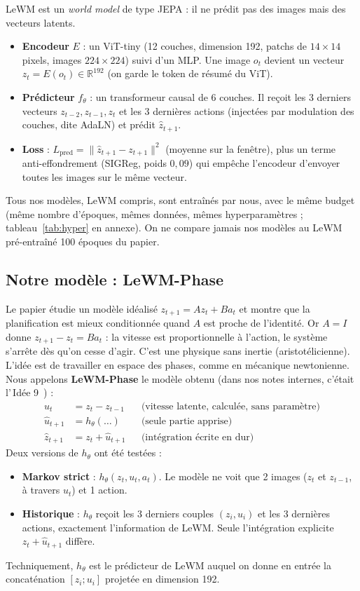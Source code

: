 \documentclass[11pt,a4paper]{article}
\newcommand{\og}{\guillemotleft\,\ignorespaces}
\newcommand{\fg}{\unskip\,\guillemotright}
\newcommand{\Lpred}{L_{\mathrm{pred}}}
\begin{document}
LeWM est un \emph{world model} de type JEPA : il ne prédit pas des images mais des vecteurs
latents.
\begin{itemize}
  \item \textbf{Encodeur} $E$ : un ViT-tiny (12 couches, dimension 192, patchs de
  $14\times14$ pixels, images $224\times224$) suivi d'un MLP. Une image $o_t$ devient un
  vecteur $z_t = E(o_t) \in \mathbb{R}^{192}$ (on garde le token de résumé du ViT).
  \item \textbf{Prédicteur} $f_\theta$ : un transformeur causal de 6 couches. Il reçoit les
  3 derniers vecteurs $z_{t-2}, z_{t-1}, z_t$ et les 3 dernières actions (injectées par
  modulation des couches, dite AdaLN) et prédit $\hat z_{t+1}$.
  \item \textbf{Loss} : $\Lpred = \|\hat z_{t+1} - z_{t+1}\|^2$ (moyenne sur la fenêtre),
  plus un terme anti-effondrement (SIGReg, poids $0{,}09$) qui empêche l'encodeur
  d'envoyer toutes les images sur le même vecteur.
\end{itemize}
Tous nos modèles, LeWM compris, sont entraînés par nous, avec le même budget (même nombre
d'époques, mêmes données, mêmes hyperparamètres ; tableau~\ref{tab:hyper} en annexe). On ne
compare jamais nos modèles au LeWM pré-entraîné 100 époques du papier.

\subsection{Notre modèle : LeWM-Phase}

Le papier étudie un modèle idéalisé $z_{t+1} = A z_t + B a_t$ et montre que la
planification est mieux conditionnée quand $A$ est proche de l'identité. Or $A = I$ donne
$z_{t+1} - z_t = B a_t$ : la vitesse est proportionnelle à l'action, le système s'arrête dès
qu'on cesse d'agir. C'est une physique sans inertie (aristotélicienne). L'idée est de
travailler en espace des phases, comme en mécanique newtonienne. Nous appelons
\textbf{LeWM-Phase} le modèle obtenu (dans nos notes internes, c'était l'\og Idée 9 \fg) :
\begin{align*}
  u_t &= z_t - z_{t-1} && \text{(vitesse latente, calculée, sans paramètre)}\\
  \hat u_{t+1} &= h_\theta(\ldots) && \text{(seule partie apprise)}\\
  \hat z_{t+1} &= z_t + \hat u_{t+1} && \text{(intégration écrite en dur)}
\end{align*}
Deux versions de $h_\theta$ ont été testées :
\begin{itemize}
  \item \textbf{Markov strict} : $h_\theta(z_t, u_t, a_t)$. Le modèle ne voit que 2 images
  ($z_t$ et $z_{t-1}$, à travers $u_t$) et 1 action.
  \item \textbf{Historique} : $h_\theta$ reçoit les 3 derniers couples $(z_i, u_i)$ et les
  3 dernières actions, exactement l'information de LeWM. Seule l'intégration explicite
  $z_t + \hat u_{t+1}$ diffère.
\end{itemize}
Techniquement, $h_\theta$ est le prédicteur de LeWM auquel on donne en entrée la
concaténation $[z_i ; u_i]$ projetée en dimension 192.
\end{document}
